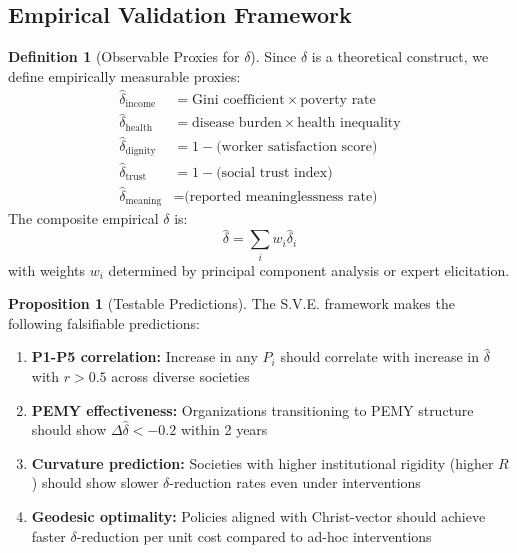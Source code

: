 \documentclass[11pt,a4paper]{article}
\theoremstyle{definition}
\newtheorem{definition}{Definition}[section]
\newtheorem{proposition}{Proposition}[section]
\theoremstyle{remark}
\begin{document}
\subsection{Empirical Validation Framework}
\label{subsec:empirical_validation}

\begin{definition}[Observable Proxies for $\delta$]
Since $\delta$ is a theoretical construct, we define empirically measurable proxies:
\begin{align*}
\hat{\delta}_{\text{income}} &= \text{Gini coefficient} \times \text{poverty rate} \\
\hat{\delta}_{\text{health}} &= \text{disease burden} \times \text{health inequality} \\
\hat{\delta}_{\text{dignity}} &= 1 - \text{(worker satisfaction score)} \\
\hat{\delta}_{\text{trust}} &= 1 - \text{(social trust index)} \\
\hat{\delta}_{\text{meaning}} &= \text{(reported meaninglessness rate)}
\end{align*}
The composite empirical $\delta$ is:
\[
\hat{\delta} = \sum_{i} w_i \hat{\delta}_i
\]
with weights $w_i$ determined by principal component analysis or expert elicitation.
\end{definition}

\begin{proposition}[Testable Predictions]
The S.V.E. framework makes the following falsifiable predictions:
\begin{enumerate}[leftmargin=1.5em]
    \item \textbf{P1-P5 correlation:} Increase in any $P_i$ should correlate with increase in $\hat{\delta}$ with $r > 0.5$ across diverse societies
    \item \textbf{PEMY effectiveness:} Organizations transitioning to PEMY structure should show $\Delta\hat{\delta} < -0.2$ within 2 years
    \item \textbf{Curvature prediction:} Societies with higher institutional rigidity (higher $R$) should show slower $\delta$-reduction rates even under interventions
    \item \textbf{Geodesic optimality:} Policies aligned with Christ-vector should achieve faster $\delta$-reduction per unit cost compared to ad-hoc interventions
\end{enumerate}
\end{proposition}
\end{document}
